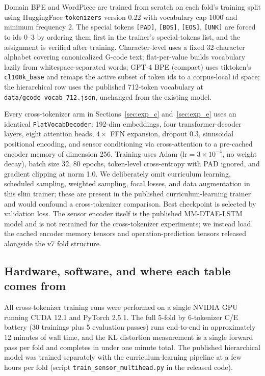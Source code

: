 \documentclass[11pt]{article}
\begin{document}
Domain BPE and WordPiece are trained from scratch on each fold's training split using HuggingFace \texttt{tokenizers} version 0.22 with vocabulary cap 1000 and minimum frequency 2. The special tokens \texttt{[PAD]}, \texttt{[BOS]}, \texttt{[EOS]}, \texttt{[UNK]} are forced to ids 0--3 by ordering them first in the trainer's special-tokens list, and the assignment is verified after training. Character-level uses a fixed 32-character alphabet covering canonicalized G-code text; flat-per-value builds vocabulary lazily from whitespace-separated words; GPT-4 BPE (compact) uses tiktoken's \texttt{cl100k\_base} and remaps the active subset of token ids to a corpus-local id space; the hierarchical row uses the published 712-token vocabulary at \texttt{data/gcode\_vocab\_712.json}, unchanged from the existing model.

Every cross-tokenizer arm in Sections~\ref{sec:exp_c} and~\ref{sec:exp_e} uses an identical \texttt{FlatVocabDecoder}: 192-dim embeddings, four transformer-decoder layers, eight attention heads, $4\times$ FFN expansion, dropout 0.3, sinusoidal positional encoding, and sensor conditioning via cross-attention to a pre-cached encoder memory of dimension 256. Training uses Adam ($\text{lr} = 3 \times 10^{-4}$, no weight decay), batch size 32, 80 epochs, token-level cross-entropy with PAD ignored, and gradient clipping at norm 1.0. We deliberately omit curriculum learning, scheduled sampling, weighted sampling, focal losses, and data augmentation in this slim trainer; these are present in the published curriculum-learning trainer and would confound a cross-tokenizer comparison. Best checkpoint is selected by validation loss. The sensor encoder itself is the published MM-DTAE-LSTM model and is not retrained for the cross-tokenizer experiments; we instead load the cached encoder memory tensors and operation-prediction tensors released alongside the v7 fold structure.

\subsection{Hardware, software, and where each table comes from}
\label{sec:repro_compute}

All cross-tokenizer training runs were performed on a single NVIDIA GPU running CUDA 12.1 and PyTorch 2.5.1. The full 5-fold by 6-tokenizer C/E battery (30 trainings plus 5 evaluation passes) runs end-to-end in approximately 12 minutes of wall time, and the KL distortion measurement is a single forward pass per fold and completes in under one minute total. The published hierarchical model was trained separately with the curriculum-learning pipeline at a few hours per fold (script \texttt{train\_sensor\_multihead.py} in the released code).
\end{document}
